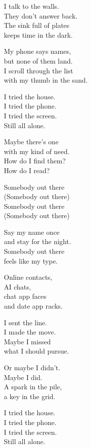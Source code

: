 \begin{lyrics}

I talk to the walls.\\
They don’t answer back.\\
The sink full of plates\\
keeps time in the dark.

My phone says names,\\
but none of them land.\\
I scroll through the list\\
with my thumb in the sand.

I tried the house.\\
I tried the phone.\\
I tried the screen.\\
Still all alone.

Maybe there’s one\\
with my kind of need.\\
How do I find them?\\
How do I read?

Somebody out there\\
(Somebody out there)\\
Somebody out there\\
(Somebody out there)

Say my name once\\
and stay for the night.\\
Somebody out there\\
feels like my type.

Online contacts,\\
AI chats,\\
chat app faces\\
and date app racks.

I sent the line.\\
I made the move.\\
Maybe I missed\\
what I should pursue.

Or maybe I didn’t.\\
Maybe I did.\\
A spark in the pile,\\
a key in the grid.

I tried the house.\\
I tried the phone.\\
I tried the screen.\\
Still all alone.


\end{lyrics}
